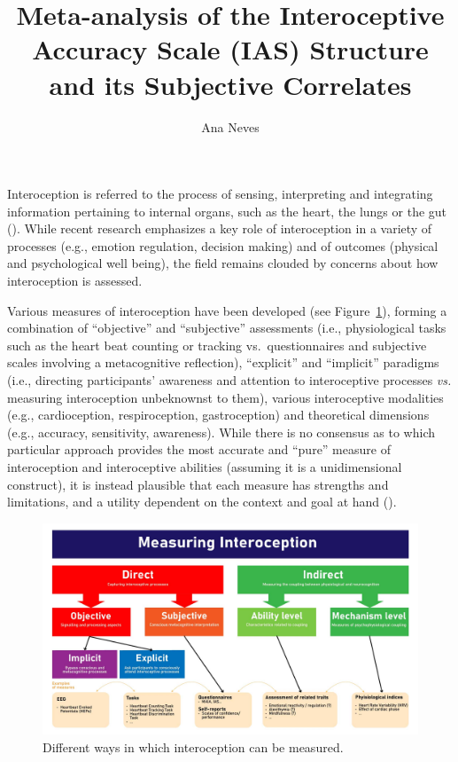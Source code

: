 \documentclass[
  man,
  floatsintext,
  longtable,
  nolmodern,
  notxfonts,
  notimes,
  colorlinks=true,linkcolor=blue,citecolor=blue,urlcolor=blue]{apa7}
\title{Meta-analysis of the Interoceptive Accuracy Scale (IAS) Structure
and its Subjective Correlates}
\author{Ana Neves}
\affiliation{
{School of Psychology, University of Sussex}}
\begin{document}
\maketitle


\setcounter{secnumdepth}{-\maxdimen} %

\setlength\LTleft{0pt}

\resetlinenumber[1]

Interoception is referred to the process of sensing, interpreting and
integrating information pertaining to internal organs, such as the
heart, the lungs or the gut (). While recent research emphasizes a key
role of interoception in a variety of processes (e.g., emotion
regulation, decision making) and of outcomes (physical and psychological
well being), the field remains clouded by concerns about how
interoception is assessed.

Various measures of interoception have been developed (see
Figure~\ref{fig-measures}), forming a combination of ``objective'' and
``subjective'' assessments (i.e., physiological tasks such as the heart
beat counting or tracking vs.~questionnaires and subjective scales
involving a metacognitive reflection), ``explicit'' and ``implicit''
paradigms (i.e., directing participants' awareness and attention to
interoceptive processes \emph{vs.} measuring interoception unbeknownst
to them), various interoceptive modalities (e.g., cardioception,
respiroception, gastroception) and theoretical dimensions (e.g.,
accuracy, sensitivity, awareness). While there is no consensus as to
which particular approach provides the most accurate and ``pure''
measure of interoception and interoceptive abilities (assuming it is a
unidimensional construct), it is instead plausible that each measure has
strengths and limitations, and a utility dependent on the context and
goal at hand ().

\begin{figure}[!htbp]

{\caption{{Different ways in which interoception can be
measured.}{\label{fig-measures}}}}

\includegraphics[width=6.4in,height=\textheight]{figures/MeasuringInteroception.jpg}

\end{figure}
\end{document}
